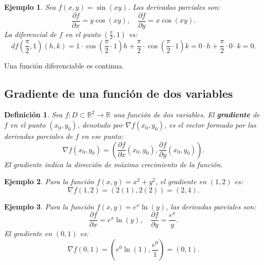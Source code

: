 \documentclass[11pt]{book}
\theoremstyle{definicion}
\newtheorem{definicion}{Definición}[section]
\theoremstyle{teorema}
\theoremstyle{ejemplo}
\newtheorem{ejemplo}{Ejemplo}[section]
\begin{document}
\begin{ejemplo}
Sea \( f(x, y) = \sin(xy) \). Las derivadas parciales son:
\[
\frac{\partial f}{\partial x} = y\cos(xy), \quad \frac{\partial f}{\partial y} = x\cos(xy).
\]
La diferencial de \( f \) en el punto \( \left(\frac{\pi}{2}, 1\right) \) es:
\[
df\left(\frac{\pi}{2}, 1\right)(h, k) = 1 \cdot \cos\left(\frac{\pi}{2} \cdot 1\right)h + \frac{\pi}{2} \cdot \cos\left(\frac{\pi}{2} \cdot 1\right)k = 0 \cdot h + \frac{\pi}{2} \cdot 0 \cdot k = 0.
\]
\end{ejemplo}

\noindent Una función diferenciable es continua. 

\subsection{Gradiente de una función de dos variables}

\begin{definicion}
Sea \( f: D \subset \mathbb{R}^2 \to \mathbb{R} \) una función de dos variables. El \textbf{gradiente} de \( f \) en el punto \( (x_0, y_0) \), denotado por \( \nabla f(x_0, y_0) \), es el vector formado por las derivadas parciales de \( f \) en ese punto:
\[
\nabla f(x_0, y_0) = \left( \frac{\partial f}{\partial x}(x_0, y_0), \frac{\partial f}{\partial y}(x_0, y_0) \right).
\]
El gradiente indica la dirección de máximo crecimiento de la función.
\end{definicion}

\begin{ejemplo}
Para la función \( f(x, y) = x^2 + y^2 \), el gradiente en \( (1, 2) \) es:
\[
\nabla f(1, 2) = \left( 2(1), 2(2) \right) = (2, 4).
\]
\end{ejemplo}

\begin{ejemplo}
Para la función \( f(x, y) = e^{x} \ln(y) \), las derivadas parciales son:
\[
\frac{\partial f}{\partial x} = e^{x} \ln(y), \quad \frac{\partial f}{\partial y} = \frac{e^{x}}{y}.
\]
El gradiente en \( (0, 1) \) es:
\[
\nabla f(0, 1) = \left( e^{0} \ln(1), \frac{e^{0}}{1} \right) = (0, 1).
\]
\end{ejemplo}

%
\end{document}
